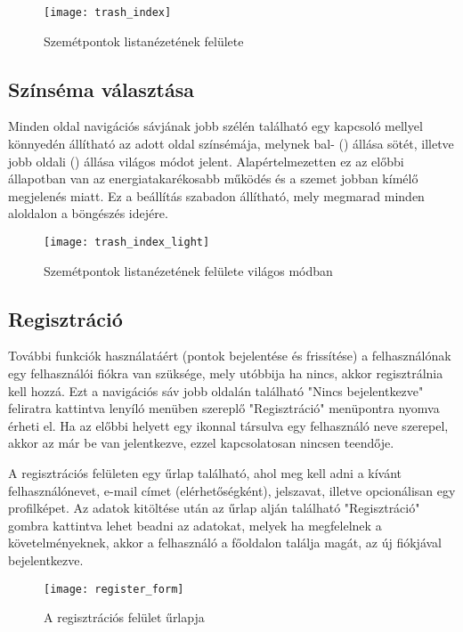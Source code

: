 \begin{figure}[H]
	\centering
	\texttt{[image: trash\_index]}
	\caption{Szemétpontok listanézetének felülete}
	\label{fig:trash_index}
\end{figure}


\subsection{Színséma választása}

Minden oldal navigációs sávjának jobb szélén található egy kapcsoló mellyel könnyedén állítható az adott oldal színsémája, melynek bal- () állása sötét, illetve jobb oldali () állása világos módot jelent. Alapértelmezetten ez az előbbi állapotban van az energiatakarékosabb működés és a szemet jobban kímélő megjelenés miatt. Ez a beállítás szabadon állítható, mely megmarad minden aloldalon a böngészés idejére.

\begin{figure}[H]
	\centering
	\texttt{[image: trash\_index\_light]}
	\caption{Szemétpontok listanézetének felülete világos módban}
	\label{fig:trash_index_light}
\end{figure}

\subsection{Regisztráció}

További funkciók használatáért (pontok bejelentése és frissítése) a felhasználónak egy felhasználói fiókra van szüksége, mely utóbbija ha nincs, akkor regisztrálnia kell hozzá. Ezt a navigációs sáv jobb oldalán található "Nincs bejelentkezve" feliratra kattintva lenyíló menüben szereplő "Regisztráció" menüpontra nyomva érheti el. Ha az előbbi helyett egy  ikonnal társulva egy felhasználó neve szerepel, akkor az már be van jelentkezve, ezzel kapcsolatosan nincsen teendője.\par
A regisztrációs felületen egy űrlap található, ahol meg kell adni a kívánt felhasználónevet, e-mail címet (elérhetőségként), jelszavat, illetve opcionálisan egy profilképet. Az adatok kitöltése után az űrlap alján található "Regisztráció" gombra kattintva lehet beadni az adatokat, melyek ha megfelelnek a követelményeknek, akkor a felhasználó a főoldalon találja magát, az új fiókjával bejelentkezve.

\begin{figure}[H]
	\centering
	\texttt{[image: register\_form]}
	\caption{A regisztrációs felület űrlapja}
	\label{fig:register_form}
\end{figure}

